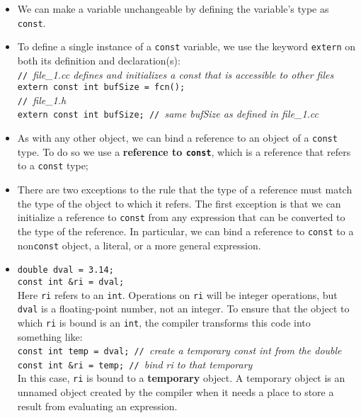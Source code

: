 \begin{itemize}
\item
We can make a variable unchangeable by defining the variable's type as \texttt{const}.

\item
To define a single instance of a \texttt{const} variable, we use the keyword \texttt{extern} on both its definition and declaration(s):\\
\hspace*{1em}\texttt{// }\textit{file\_1.cc defines and initializes a const that is accessible to other files}\\
\hspace*{1em}\texttt{extern const int bufSize = fcn();}\\
\hspace*{1em}\texttt{// }\textit{file\_1.h}\\
\hspace*{1em}\texttt{extern const int bufSize; // }\textit{same bufSize as defined in file\_1.cc}

\item
As with any other object, we can bind a reference to an object of a \texttt{const} type. To do so we use a \textbf{reference to \texttt{const}}, which is a reference that refers to a \texttt{const} type;

\item
There are two exceptions to the rule that the type of a reference must match the type of the object to which it refers. The first exception is that we can initialize a reference to \texttt{const} from any expression that can be converted to the type of the reference. In particular, we can bind a reference to \texttt{const} to a non\texttt{const} object, a literal, or a more general expression.


\item
\hspace*{1em}\texttt{double dval = 3.14;}\\
\hspace*{1em}\texttt{const int \&ri = dval;}\\
Here \texttt{ri} refers to an \texttt{int}. Operations on \texttt{ri} will be integer operations, but \texttt{dval} is a floating-point number, not an integer. To ensure that the object to which \texttt{ri} is bound is an \texttt{int}, the compiler transforms this code into something like:\\
\hspace*{1em}\texttt{const int temp = dval; // }\textit{create a temporary const int from the double}\\
\hspace*{1em}\texttt{const int \&ri = temp; // }\textit{bind ri to that temporary}\\
In this case, \texttt{ri} is bound to a \textbf{temporary} object. A temporary object is an unnamed object created by the compiler when it needs a place to store a result from evaluating an expression.


\end{itemize}
